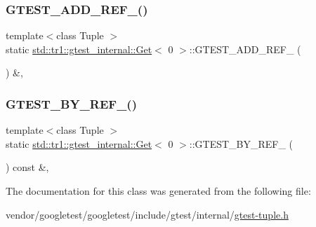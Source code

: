 \subsubsection{\texorpdfstring{G\+T\+E\+S\+T\+\_\+\+A\+D\+D\+\_\+\+R\+E\+F\+\_\+()}{GTEST\_ADD\_REF\_()}}
{\footnotesize\ttfamily template$<$class Tuple $>$ \\
static \hyperlink{classstd_1_1tr1_1_1gtest__internal_1_1_get}{std\+::tr1\+::gtest\+\_\+internal\+::\+Get}$<$ 0 $>$\+::G\+T\+E\+S\+T\+\_\+\+A\+D\+D\+\_\+\+R\+E\+F\+\_\+ (\begin{DoxyParamCaption}\item[{\hyperlink{gtest-tuple_8h_a1b7f133d8aa02e0b7afed7b66781eeb7}{G\+T\+E\+S\+T\+\_\+\+T\+U\+P\+L\+E\+\_\+\+E\+L\+E\+M\+E\+N\+T\+\_\+}(0, Tuple)}]{ }\end{DoxyParamCaption}) \&\hspace{0.3cm}{\ttfamily [inline]}, {\ttfamily [static]}}

\mbox{\label{classstd_1_1tr1_1_1gtest__internal_1_1_get_3_010_01_4_a195b3853de45077f9a324c455f22d7e2}} 
\subsubsection{\texorpdfstring{G\+T\+E\+S\+T\+\_\+\+B\+Y\+\_\+\+R\+E\+F\+\_\+()}{GTEST\_BY\_REF\_()}}
{\footnotesize\ttfamily template$<$class Tuple $>$ \\
static \hyperlink{classstd_1_1tr1_1_1gtest__internal_1_1_get}{std\+::tr1\+::gtest\+\_\+internal\+::\+Get}$<$ 0 $>$\+::G\+T\+E\+S\+T\+\_\+\+B\+Y\+\_\+\+R\+E\+F\+\_\+ (\begin{DoxyParamCaption}\item[{\hyperlink{gtest-tuple_8h_a1b7f133d8aa02e0b7afed7b66781eeb7}{G\+T\+E\+S\+T\+\_\+\+T\+U\+P\+L\+E\+\_\+\+E\+L\+E\+M\+E\+N\+T\+\_\+}(0, Tuple)}]{ }\end{DoxyParamCaption}) const \&\hspace{0.3cm}{\ttfamily [inline]}, {\ttfamily [static]}}



The documentation for this class was generated from the following file\+:\begin{DoxyCompactItemize}
\item 
vendor/googletest/googletest/include/gtest/internal/\hyperlink{gtest-tuple_8h}{gtest-\/tuple.\+h}\end{DoxyCompactItemize}

